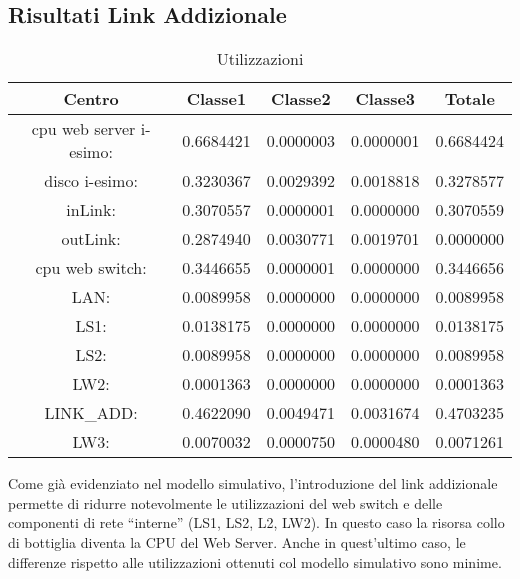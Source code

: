 \subsection{Risultati Link Addizionale}
\begin{table}[H]
\begin{center}
\begin{tabular}{||c|c|c|c|c||}
\hline
Centro &Classe1 &Classe2 &Classe3 &Totale\\
\hline
\hline
 cpu web server i-esimo: 	&0.6684421	&0.0000003	&0.0000001	&0.6684424	\\\hline
 disco i-esimo: 	&0.3230367	&0.0029392	&0.0018818	&0.3278577	\\\hline
 inLink: 	&0.3070557	&0.0000001	&0.0000000	&0.3070559	\\\hline
 outLink: 	&0.2874940	&0.0030771	&0.0019701	&0.0000000	\\\hline
 cpu web switch: 	&0.3446655	&0.0000001	&0.0000000	&0.3446656	\\\hline
 LAN: 	&0.0089958	&0.0000000	&0.0000000	&0.0089958	\\\hline
 LS1: 	&0.0138175	&0.0000000	&0.0000000	&0.0138175	\\\hline
 LS2:	&0.0089958	&0.0000000	&0.0000000	&0.0089958	\\\hline
 LW2: 	&0.0001363	&0.0000000	&0.0000000	&0.0001363	\\\hline
 LINK\_ADD: 	&0.4622090	&0.0049471	&0.0031674	&0.4703235	\\\hline
 LW3: 	&0.0070032	&0.0000750	&0.0000480	&0.0071261	\\\hline
\end{tabular}
\end{center}
\caption{Utilizzazioni}
\label{utilizzazioni}
\end{table}
Come già evidenziato nel modello simulativo, l'introduzione del link addizionale permette di ridurre notevolmente le utilizzazioni del web switch e delle componenti di rete “interne” (LS1, LS2, L2, LW2). In questo caso la risorsa collo di bottiglia diventa la CPU del Web Server. Anche in quest'ultimo caso, le differenze rispetto alle utilizzazioni  ottenuti col modello simulativo sono minime.
